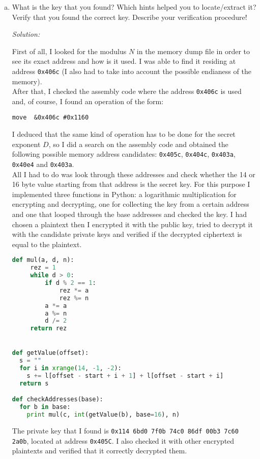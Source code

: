 \documentclass[a4paper,11pt]{article}
\newenvironment{solution}%
{\par{\noindent\small\textit{Solution:}}\vspace{-12pt}\begin{framed}}%
{\end{framed}\par}
\begin{document}
\begin{enumerate}[(a)]
\begin{solution}
Using this file format I was able to disassemble it using the package {\em python-msp430-tools}
\cite{pymsp430}, and obtained the corresponding assembly code.

\end{solution}\fi

\item What is the key that you found? Which hints helped you to
locate/extract it? Verify that you found the correct key. Describe your
verification procedure!
\ifsolution\begin{solution}
First of all, I looked for the modulus $N$ in the memory dump file in order to
see its exact address and how is it used. I was able to find it residing at address
{\tt 0x406c} (I also had to take into account the possible endianess of the memory).\\
After that, I checked the assembly code where the address {\tt 0x406c} is used and, of course,
I found an operation of the form:
\begin{lstlisting}
move  &0x406c #0x1160
\end{lstlisting}

I deduced that the same kind of operation has to be done for the secret exponent $D$, so I
did a search on the assembly code and obtained the following possible memory address candidates:
{\tt 0x405c}, {\tt 0x404c}, {\tt 0x403a}, {\tt 0x40e4} and {\tt 0x403a}.\\
All I had to do was look through these addresses and check whether the 14 or 16 byte value starting
from that address is the secret key. For this purpose I implemented three functions in Python:
a logarithmic multiplication for encrypting and decrypting, one for collecting the key from a certain
address and one that looped through the base addresses and checked the key. I had chosen a plaintext
then I encrypted it with the public key, tried to decrypt it with the candidate private keys and verified
if the decrypted ciphertext is equal to the plaintext.\\

\begin{lstlisting}[language=Python]
def mul(a, d, n):
     rez = 1
     while d > 0:
         if d % 2 == 1:
             rez *= a
             rez %= n
         a *= a
         a %= n
         d /= 2
     return rez


def getValue(offset):
  s = ""
  for i in xrange(14, -1, -2):
    s += l[offset - start + i + 1] + l[offset - start + i]
  return s

def checkAddresses(base):
  for b in base:
    print mul(c, int(getValue(b), base=16), n)
\end{lstlisting}

The private key that I found is {\tt 0x114 6bd0 7f0b 74c0 86df 00b3 7c60 2a0b}, located
at address {\tt 0x405C}.
I also checked it with other encrypted plaintexts and verified that it correctly
decrypted them.

\end{solution}\fi

\end{enumerate}
\end{document}
